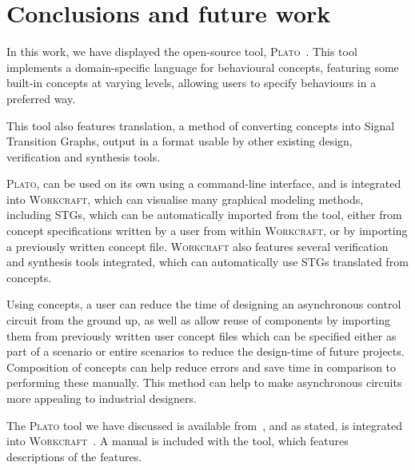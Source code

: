 \documentclass[british,conference,compsoc]{IEEEtran}
\newcommand{\noun}[1]{\textsc{#1}}
\begin{document}
\section{Conclusions and future work\label{sec:conclusions}}

\vspace{-3mm}

In this work, we have displayed the open-source
tool, \noun{Plato}~\cite{2016_concepts_github}. This tool implements a 
domain-specific language for behavioural concepts, featuring some built-in 
concepts at varying levels, allowing users to specify behaviours in a preferred 
way. 

This tool also features translation, a method of converting concepts into Signal
Transition Graphs, output in a format usable by other existing design, 
verification and synthesis tools. 

\noun{Plato}, can be used on its own using a command-line interface, and is
integrated into \noun{Workcraft}, which can visualise many graphical modeling
methods, including STGs, which can be automatically imported from the
tool, either from concept specifications written by a user from within 
\noun{Workcraft}, or by importing a previously written concept file.
\noun{Workcraft} also features several verification and synthesis tools 
integrated, which can automatically use STGs translated from concepts. 

Using concepts, a user can reduce the time of designing an asynchronous
control circuit from the ground up, as well as allow reuse of components
by importing them from previously written user concept files which can be 
specified either as part of a scenario or entire scenarios to reduce the 
design-time of future projects. Composition of concepts can help
reduce errors and save time in comparison to performing these manually.
This method can help to make asynchronous circuits more appealing
to industrial designers.


The \noun{Plato} tool we have discussed is available 
from~\cite{2016_concepts_github}, and as stated, is integrated into 
\noun{Workcraft}~\cite{Workcraft_website}. A manual is included with the tool, 
which features descriptions of the features. 



\end{document}

